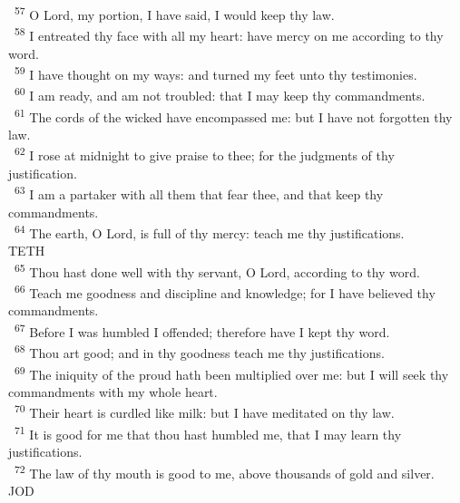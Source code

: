 \documentclass[a5paper,12pt]{article}
\begin{document}
\begin{multicols*}{2}
~\textsuperscript{57} O Lord, my portion, I have said, I would keep thy law.\\
~\textsuperscript{58} I entreated thy face with all my heart: have mercy on me according to thy word.\\
~\textsuperscript{59} I have thought on my ways: and turned my feet unto thy testimonies.\\
~\textsuperscript{60} I am ready, and am not troubled: that I may keep thy commandments.\\
~\textsuperscript{61} The cords of the wicked have encompassed me: but I have not forgotten thy law.\\
~\textsuperscript{62} I rose at midnight to give praise to thee; for the judgments of thy justification.\\
~\textsuperscript{63} I am a partaker with all them that fear thee, and that keep thy commandments.\\
~\textsuperscript{64} The earth, O Lord, is full of thy mercy: teach me thy justifications.\\

TETH\\

~\textsuperscript{65} Thou hast done well with thy servant, O Lord, according to thy word.\\
~\textsuperscript{66} Teach me goodness and discipline and knowledge; for I have believed thy commandments.\\
~\textsuperscript{67} Before I was humbled I offended; therefore have I kept thy word.\\
~\textsuperscript{68} Thou art good; and in thy goodness teach me thy justifications.\\
~\textsuperscript{69} The iniquity of the proud hath been multiplied over me: but I will seek thy commandments with my whole heart.\\
~\textsuperscript{70} Their heart is curdled like milk: but I have meditated on thy law.\\
~\textsuperscript{71} It is good for me that thou hast humbled me, that I may learn thy justifications.\\
~\textsuperscript{72} The law of thy mouth is good to me, above thousands of gold and silver.\\

JOD\\


\end{multicols*}
\end{document}
